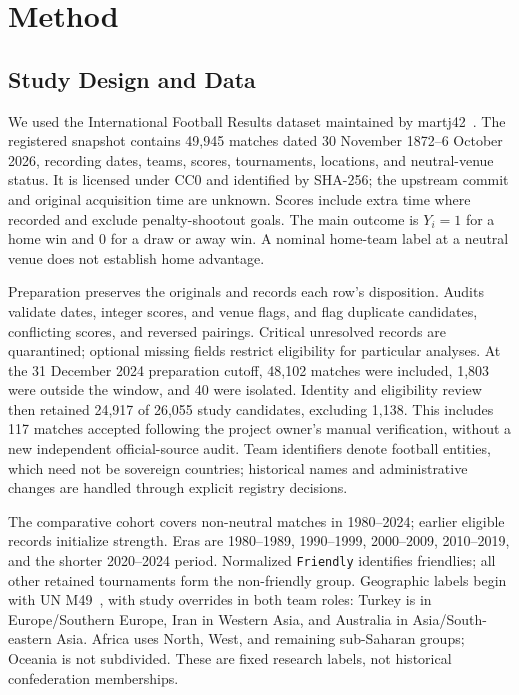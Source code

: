 \section{Method}
\label{sec:method}

\subsection{Study Design and Data}
\label{sec:data-design}

We used the International Football Results dataset maintained by martj42~\cite{martj42_data}. The registered snapshot contains 49,945 matches dated 30 November 1872--6 October 2026, recording dates, teams, scores, tournaments, locations, and neutral-venue status. It is licensed under CC0 and identified by SHA-256; the upstream commit and original acquisition time are unknown. Scores include extra time where recorded and exclude penalty-shootout goals. The main outcome is $Y_i=1$ for a home win and $0$ for a draw or away win. A nominal home-team label at a neutral venue does not establish home advantage.

Preparation preserves the originals and records each row's disposition. Audits validate dates, integer scores, and venue flags, and flag duplicate candidates, conflicting scores, and reversed pairings. Critical unresolved records are quarantined; optional missing fields restrict eligibility for particular analyses. At the 31 December 2024 preparation cutoff, 48,102 matches were included, 1,803 were outside the window, and 40 were isolated. Identity and eligibility review then retained 24,917 of 26,055 study candidates, excluding 1,138. This includes 117 matches accepted following the project owner's manual verification, without a new independent official-source audit. Team identifiers denote football entities, which need not be sovereign countries; historical names and administrative changes are handled through explicit registry decisions.

The comparative cohort covers non-neutral matches in 1980--2024; earlier eligible records initialize strength. Eras are 1980--1989, 1990--1999, 2000--2009, 2010--2019, and the shorter 2020--2024 period. Normalized \texttt{Friendly} identifies friendlies; all other retained tournaments form the non-friendly group. Geographic labels begin with UN M49~\cite{un_m49}, with study overrides in both team roles: Turkey is in Europe/Southern Europe, Iran in Western Asia, and Australia in Asia/South-eastern Asia. Africa uses North, West, and remaining sub-Saharan groups; Oceania is not subdivided. These are fixed research labels, not historical confederation memberships.

